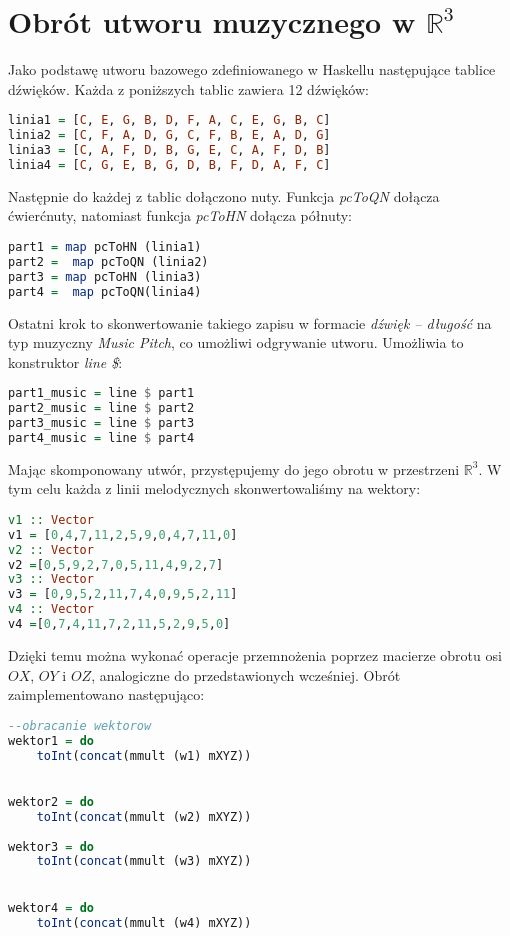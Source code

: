 
\section{Obrót utworu muzycznego w \texorpdfstring{$\mathbb{R}^{3}$}{R3}}

Jako podstawę utworu bazowego zdefiniowanego w Haskellu następujące tablice dźwięków. Każda z poniższych tablic zawiera 12 dźwięków:
\begin{lstlisting}[language = Haskell]
linia1 = [C, E, G, B, D, F, A, C, E, G, B, C] 
linia2 = [C, F, A, D, G, C, F, B, E, A, D, G] 
linia3 = [C, A, F, D, B, G, E, C, A, F, D, B]
linia4 = [C, G, E, B, G, D, B, F, D, A, F, C] 
\end{lstlisting}
Następnie do każdej z tablic dołączono nuty. Funkcja \textit{pcToQN} dołącza ćwierćnuty, natomiast funkcja \textit{pcToHN} dołącza półnuty:
\begin{lstlisting}[language = Haskell]
part1 = map pcToHN (linia1)
part2 =  map pcToQN (linia2)
part3 = map pcToHN (linia3)
part4 =  map pcToQN(linia4)
\end{lstlisting}
Ostatni krok to skonwertowanie takiego zapisu w formacie \textit{dźwięk -- długość} na typ muzyczny \textit{Music Pitch}, co umożliwi odgrywanie utworu. Umożliwia to konstruktor \textit{line \$}:
\begin{lstlisting}[language = Haskell]
part1_music = line $ part1
part2_music = line $ part2
part3_music = line $ part3
part4_music = line $ part4
\end{lstlisting}
Mając skomponowany utwór, przystępujemy do jego obrotu w przestrzeni $\mathbb{R}^{3}$. W tym celu każda z linii melodycznych skonwertowaliśmy na wektory:
\begin{lstlisting}[language = Haskell]
v1 :: Vector
v1 = [0,4,7,11,2,5,9,0,4,7,11,0]
v2 :: Vector
v2 =[0,5,9,2,7,0,5,11,4,9,2,7]
v3 :: Vector
v3 = [0,9,5,2,11,7,4,0,9,5,2,11]
v4 :: Vector
v4 =[0,7,4,11,7,2,11,5,2,9,5,0]
\end{lstlisting}
Dzięki temu można wykonać operacje przemnożenia poprzez macierze obrotu osi $OX$, $OY$ i $OZ$, analogiczne do przedstawionych wcześniej.
Obrót zaimplementowano następująco:
\begin{lstlisting}[language = Haskell]
--obracanie wektorow
wektor1 = do
    toInt(concat(mmult (w1) mXYZ))
    

wektor2 = do
    toInt(concat(mmult (w2) mXYZ))
    
wektor3 = do
    toInt(concat(mmult (w3) mXYZ))
    

wektor4 = do
    toInt(concat(mmult (w4) mXYZ))
\end{lstlisting}

